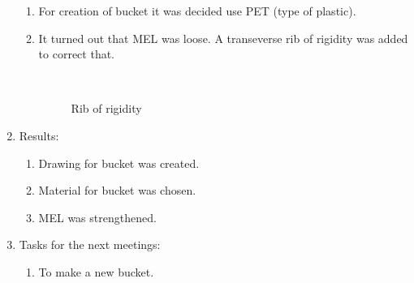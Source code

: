 \begin{enumerate}
\begin{enumerate}
	  \item For creation of bucket it was decided use PET (type of plastic).
	  
	  \item It turned out that MEL was loose. A transeverse rib of rigidity was added to correct that.
	  
	  \begin{figure}[H]
	  	\begin{minipage}[h]{0.2\linewidth}
	  		\center  
	  	\end{minipage}
	  	\begin{minipage}[h]{0.6\linewidth}
	  		\caption{Rib of rigidity}
	  	\end{minipage}
	  \end{figure}
	  
    \end{enumerate}
    
	\item Results: 
	\begin{enumerate}
	  \item Drawing for bucket was created.
	  
	  \item Material for bucket was chosen.
	  
	  \item MEL was strengthened.
	  
    \end{enumerate}
    
	\item Tasks for the next meetings:
	\begin{enumerate}
	  \item To make a new bucket.
	  
    \end{enumerate}     
\end{enumerate}
\fillpage
